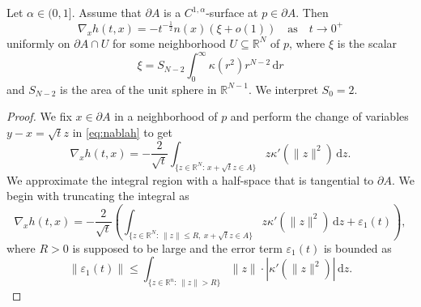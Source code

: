 \documentclass[graybox]{svmult}
\newcommand{\ep}{\varepsilon}
\renewcommand{\d}{\mathrm{d}}  %
\newcommand{\R}{\mathbb{R}}  %
\renewcommand{\AA}{A}  %
\newcommand{\pp}{p}
\begin{document}
\begin{theorem}\label{Thm:normal} Let  $\alpha\in (0,1]$. Assume that $\partial \AA$ is a $C^{1,\alpha}$-surface at $\pp\in \partial \AA$. Then 
\begin{equation}\label{eq:asymptotic_normal}
\nabla_x h(t,x) = -  t^{-\frac1{2}}n(x) (\xi + o(1)) \quad  \text{as}\quad t\to 0^+ 
\end{equation}
uniformly on $\partial \AA \cap U$ for some neighborhood $U\subseteq\R^N$ of $\pp$, where $\xi$ is the scalar 
$$
\xi= S_{N-2} \int_{0}^\infty \kappa(r^2)r^{N-2}\,\d r  
$$
and $S_{N-2}$ is the area of the unit sphere in $\R^{N-1}$. We interpret $S_0=2$.   
\end{theorem}
\begin{proof} We fix $x\in \partial \AA$ in a neighborhood of $\pp$ and perform the change of variables $y-x=\sqrt{t}z$ in \eqref{eq:nablah} to get 
\begin{equation}\label{eq:heat_nabla}
\nabla_x h(t,x) =  -\frac{2}{\sqrt{t}}\int_{\{z\in \R^N:\, x+\sqrt{t}z \in \AA\}} z \kappa'(\|z\|^2) \,\d z.
\end{equation}
We approximate the integral region with a half-space that is tangential to $\partial\AA$.  We begin with truncating the integral as
\begin{equation}\label{eq:cut}
\nabla_x h(t,x) = -\frac{2}{\sqrt{t}}\left(\int_{\{z\in\R^N:\,\|z\|\leq R,~x+\sqrt{t}z \in \AA\}} z \kappa'(\|z\|^2) \,\d z +\ep_1(t) \right),   
\end{equation}
where $R>0$ is supposed to be large and the error term $\ep_1(t)$ is bounded as
\begin{equation}\label{eq:e1}
\|\ep_1(t)\| \le \int_{\{z\in\R^n:\,\|z\|> R\}} \|z\|\!\cdot\! |\kappa'(\|z\|^2)| \,\d z. 
\end{equation}

\end{proof}
\end{document}
